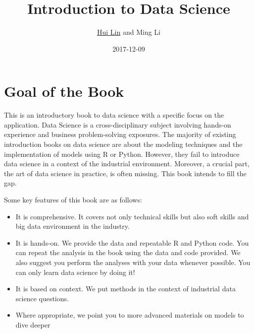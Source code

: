 \documentclass[12pt,]{krantz}
\title{Introduction to Data Science}
\author{\href{http://scientistcafe.com}{Hui Lin} and Ming Li}
\date{2017-12-09}
\theoremstyle{definition}
\theoremstyle{definition}
\theoremstyle{remark}
\begin{document}
\maketitle

\thispagestyle{empty}
\begin{center}
\end{center}

\setlength{\abovedisplayskip}{-5pt}
\setlength{\abovedisplayshortskip}{-5pt}

{
\hypersetup{linkcolor=black}
\setcounter{tocdepth}{2}
\tableofcontents
}
\listoftables
\listoffigures
\chapter*{Goal of the Book}\label{goal-of-the-book}


This is an introductory book to data science with a specific focus on
the application. Data Science is a cross-disciplinary subject involving
hands-on experience and business problem-solving exposures. The majority
of existing introduction books on data science are about the modeling
techniques and the implementation of models using R or Python. However,
they fail to introduce data science in a context of the industrial
environment. Moreover, a crucial part, the art of data science in
practice, is often missing. This book intends to fill the gap.

Some key features of this book are as follows:

\begin{itemize}
\item
  It is comprehensive. It covers not only technical skills but also soft
  skills and big data environment in the industry.
\item
  It is hands-on. We provide the data and repeatable R and Python code.
  You can repeat the analysis in the book using the data and code
  provided. We also suggest you perform the analyses with your data
  whenever possible. You can only learn data science by doing it!
\item
  It is based on context. We put methods in the context of industrial
  data science questions.
\item
  Where appropriate, we point you to more advanced materials on models
  to dive deeper
\end{itemize}
\end{document}
